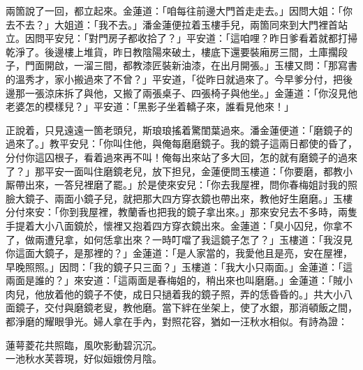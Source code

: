 兩箇說了一回，都立起來。金蓮道：「咱每往前邊大門首走走去。」因問大姐：「你去不去？」大姐道：「我不去。」潘金蓮便拉着玉樓手兒，兩箇同來到大門裡首站立。因問平安兒：「對門房子都收拾了？」平安道：「這咱哩？昨日爹看着就都打掃乾淨了。後邊樓上堆貨，昨日教陰陽來破土，樓底下還要裝廂房三間，土庫擱段子，門面開啟，一溜三間，都教漆匠裝新油漆，在出月開張。」玉樓又問：「那寫書的溫秀才，家小搬過來了不曾？」平安道，「從昨日就過來了。今早爹分付，把後邊那一張涼床拆了與他，又搬了兩張桌子、四張椅子與他坐。」金蓮道：「你沒見他老婆怎的模樣兒？」平安道：「黑影子坐着轎子來，誰看見他來！」

正說着，只見遠遠一箇老頭兒，斯琅琅搖着驚閨葉過來。潘金蓮便道：「磨鏡子的過來了。」教平安兒：「你叫住他，與俺每磨磨鏡子。我的鏡子這兩日都使的昏了，分付你這囚根子，看着過來再不叫！俺每出來站了多大回，怎的就有磨鏡子的過來了？」那平安一面叫住磨鏡老兒，放下担兒，金蓮便問玉樓道：「你要磨，都教小厮帶出來，一答兒裡磨了罷。」於是使來安兒：「你去我屋裡，問你春梅姐討我的照臉大鏡子、兩面小鏡子兒，就把那大四方穿衣鏡也帶出來，教他好生磨磨。」玉樓分付來安：「你到我屋裡，教蘭香也把我的鏡子拿出來。」那來安兒去不多時，兩隻手提着大小八面鏡於，懷裡又抱着四方穿衣鏡出來。金蓮道：「臭小囚兒，你拿不了，做兩遭兒拿，如何恁拿出來？一時叮噹了我這鏡子怎了？」玉樓道：「我沒見你這面大鏡子，是那裡的？」金蓮道：「是人家當的，我愛他且是亮，安在屋裡，早晚照照。」因問：「我的鏡子只三面？」玉樓道：「我大小只兩面。」金蓮道：「這兩面是誰的？」來安道：「這兩面是春梅姐的，稍出來也叫磨磨。」金蓮道：「賊小肉兒，他放着他的鏡子不使，成日只撾着我的鏡子照，弄的恁昏昏的。」共大小八面鏡子，交付與磨鏡老叟，教他磨。當下絆在坐架上，使了水銀，那消頓飯之間，都淨磨的耀眼爭光。婦人拿在手內，對照花容，猶如一汪秋水相似。有詩為證：

\begin{myquote} 
蓮萼菱花共照臨，風吹影動碧沉沉。\\一池秋水芙蓉現，好似姮娥傍月陰。
\end{myquote} 

